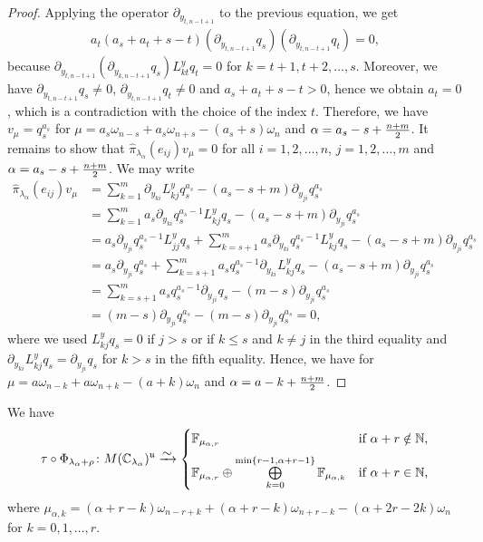 \begin{proof}
Applying the operator $\partial_{y_{t,n-t+1}}$ to the previous equation, we get
\begin{align*}
  a_t(a_s+a_t+s-t) (\partial_{y_{t,n-t+1}} q_s)(\partial_{y_{t,n-t+1}} q_t) = 0,
\end{align*}
because $\partial_{y_{t,n-t+1}} (\partial_{y_{k,n-t+1}}q_s) L^y_{kt}q_t=0$ for $k=t+1,t+2,\dots,s$. Moreover, we have $\partial_{y_{t,n-t+1}} q_s \neq 0$, $\partial_{y_{t,n-t+1}} q_t \neq 0$ and $a_s +a_t +s-t >0$, hence we obtain $a_t = 0$, which is a contradiction with the choice of the index $t$. Therefore, we have $v_\mu = q_s^{a_s}$ for $\mu= a_s \omega_{n-s} +a_s \omega_{n+s} - (a_s+s)\omega_n$ and $\alpha=a_s -s + {n + m \over 2}$. It remains to show that $\hat{\pi}_{\lambda_\alpha}\!(e_{ij})v_\mu=0$ for all $i=1,2,\dots,n$, $j=1,2,\dots,m$ and $\alpha=a_s-s+{n+m \over 2}$.
We may write
\begin{align*}
  \hat{\pi}_{\lambda_\alpha}\!(e_{ij})v_\mu &= \sum_{k=1}^m  \partial_{y_{ki}} L^y_{kj}q_s^{a_s} - (a_s-s+m) \partial_{y_{ji}}q_s^{a_s} \\
  &= \sum_{k=1}^m  a_s \partial_{y_{ki}} q_s^{a_s-1}L^y_{kj}q_s - (a_s-s+m) \partial_{y_{ji}}q_s^{a_s} \\
  & =a_s \partial_{y_{ji}} q_s^{a_s-1}L^y_{jj}q_s + \sum_{k=s+1}^m  a_s \partial_{y_{ki}} q_s^{a_s-1}L^y_{kj}q_s - (a_s-s+m) \partial_{y_{ji}}q_s^{a_s} \\ &= a_s \partial_{y_{ji}} q_s^{a_s} +  \sum_{k=s+1}^m  a_s  q_s^{a_s-1} \partial_{y_{ki}}L^y_{kj}q_s - (a_s-s+m) \partial_{y_{ji}}q_s^{a_s} \\
  &=  \sum_{k=s+1}^m  a_s  q_s^{a_s-1} \partial_{y_{ji}}q_s -(m-s)\partial_{y_{ji}}q_s^{a_s} \\
  &=(m-s)\partial_{y_{ji}}q_s^{a_s}-(m-s)\partial_{y_{ji}}q_s^{a_s}=0,
\end{align*}
where we used $L^y_{kj}q_s=0$ if $j>s$ or if $k \leq s$ and $k\neq j$ in the third equality and $\partial_{y_{ki}}L^y_{kj}q_s=\partial_{y_{ji}} q_s$ for $k > s$ in the fifth equality. Hence, we have  for $\mu=a \omega_{n-k} + a\omega_{n+k}-(a+k)\omega_n$ and $\alpha = a-k + {n+m \over 2}$.
\end{proof}

\begin{theorem}\label{thm:singular vectors decomposition AGS}
We have
\begin{align*}
  \tau \circ \Phi_{\lambda_\alpha+\rho} \colon M(\C_{\lambda_\alpha})^\mfrak{u} \riso
  \begin{cases}
    \mathbb{F}_{\mu_{\alpha,r}} &  \text{if $\alpha+r \notin \N$}, \\[2mm]
    \mathbb{F}_{\mu_{\alpha,r}} \oplus \bigoplus\limits_{k=0}^{\min\{r-1,\alpha+r-1\}} \mathbb{F}_{\mu_{\alpha,k}} & \text{if $\alpha + r \in \N$,}
  \end{cases}
\end{align*}
where $\mu_{\alpha,k}=(\alpha+r-k)\omega_{n-r+k}+(\alpha+r-k)\omega_{n+r-k}-(\alpha+2r-2k)\omega_n$ for $k=0,1,\dots,r$.
\end{theorem}

